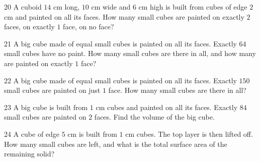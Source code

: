 \gap
\begin{probbox}{20}{\relax}
A cuboid $14$ cm long, $10$ cm wide and $6$ cm high is built from cubes of edge $2$ cm and painted on all its faces. How many small cubes are painted on exactly $2$ faces, on exactly $1$ face, on no face?
\end{probbox}
\gap
\begin{probbox}{21}{\relax}
A big cube made of equal small cubes is painted on all its faces. Exactly $64$ small cubes have no paint. How many small cubes are there in all, and how many are painted on exactly $1$ face?
\end{probbox}
\gap
\begin{probbox}{22}{\relax}
A big cube made of equal small cubes is painted on all its faces. Exactly $150$ small cubes are painted on just $1$ face. How many small cubes are there in all?
\end{probbox}
\gap
\begin{probbox}{23}{\relax}
A big cube is built from $1$ cm cubes and painted on all its faces. Exactly $84$ small cubes are painted on $2$ faces. Find the volume of the big cube.
\end{probbox}
\gap
\begin{probbox}{24}{\relax}
A cube of edge $5$ cm is built from $1$ cm cubes. The top layer is then lifted off. How many small cubes are left, and what is the total surface area of the remaining solid?
\end{probbox}
